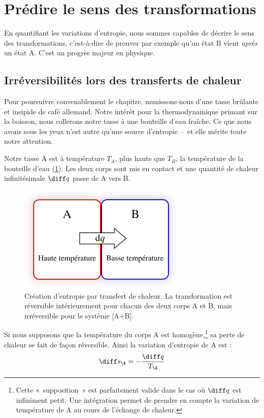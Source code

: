 \section{Prédire le sens des transformations}

	En quantifiant les variations d’entropie, nous sommes capables de décrire le sens des transformations, c’est-à-dire de prouver par exemple qu’un état B vient \emph{après} un état A. C’est un progrès majeur en physique.

	\subsection{Irréversibilités lors des transferts de chaleur}

		Pour poursuivre convenablement le chapitre, munissons-nous d’une tasse brûlante et insipide de café allemand. Notre intérêt pour la thermodynamique primant sur la boisson, nous collerons notre tasse à une bouteille d’eau fraîche. Ce que nous avons sous les yeux n’est autre qu’une source d’entropie --\ et elle mérite toute notre attention.

		Notre tasse A est à température $T_A$, plus haute que $T_B$, la température de la bouteille d’eau (\cref{fig_expérience_création_entropie}). Les deux corps sont mis en contact et une quantité de chaleur infinitésimale $\diff q$ passe de A vers B.

		\begin{figure}
			\begin{center}
				\includegraphics[width=8cm]{images/transfert_chaleur_irreversible.png}
			\end{center}
			\caption{Création d’entropie par transfert de chaleur.
		La transformation est réversible intérieurement pour chacun des deux corps A et B,
		mais irréversible pour le système [A+B].}
			\label{fig_expérience_création_entropie}
		\end{figure}


		Si nous supposons que la température du corps A est homogène,\footnote{Cette «~supposition~» est parfaitement valide dans le cas où $\diff q$ est infiniment petit. Une intégration permet de prendre en compte la variation de température de A au cours de l’échange de chaleur.}
		sa perte de chaleur se fait de façon réversible. Ainsi la variation d’entropie de A est :
		\begin{equation*}
			\diff s_\A = - \frac{\diff q}{T_\A}
		\end{equation*}

